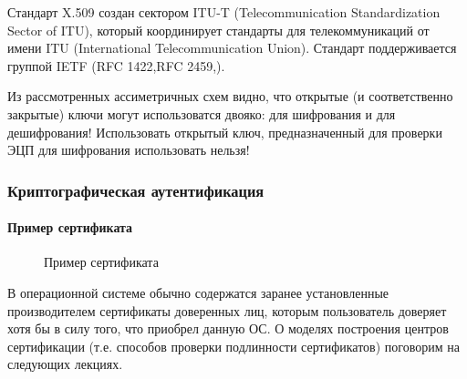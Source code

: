Стандарт X.509 создан сектором ITU-T (Telecommunication Standardization Sector of ITU), который координирует стандарты для телекоммуникаций от имени ITU (International Telecommunication Union). Стандарт поддерживается группой IETF (RFC 1422,RFC 2459,).

Из рассмотренных ассиметричных схем видно, что открытые (и соответственно закрытые) ключи могут использоватся двояко: для шифрования и для дешифрования! Использовать открытый ключ, предназначенный для проверки ЭЦП для шифрования использовать нельзя!


\begin{frame}
\frametitle{Криптографическая аутентификация}
\framesubtitle{Пример сертификата}
\begin{figure}
    \begin{center}
    \end{center}
    \caption{Пример сертификата}\label{pict:certscreen}
\end{figure}
\end{frame}


В операционной системе обычно содержатся заранее установленные производителем сертификаты доверенных лиц, которым пользователь доверяет хотя бы в силу того, что приобрел данную ОС. О моделях построения центров сертификации (т.е. способов проверки подлинности сертификатов) поговорим на следующих лекциях.

